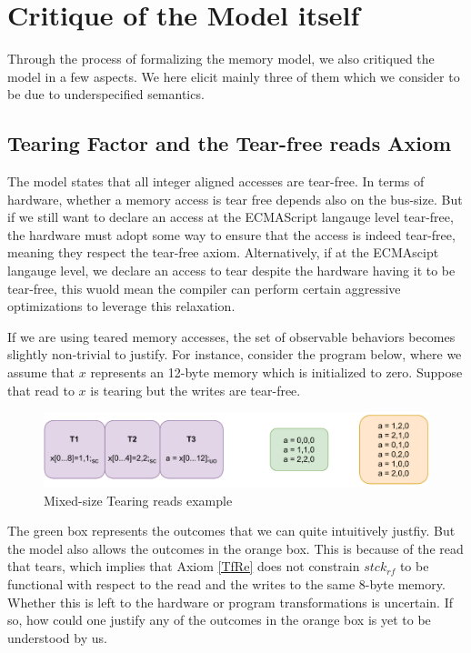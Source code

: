 \section{Critique of the Model itself}

    Through the process of formalizing the memory model, we also critiqued the model in a few aspects. 
    We here elicit mainly three of them which we consider to be due to underspecified semantics.

    \subsection{Tearing Factor and the Tear-free reads Axiom}

        The model states that all integer aligned accesses are tear-free.  
        In terms of hardware, whether a memory access is tear free depends also on the bus-size.
        But if we still want to declare an access at the ECMAScript langauge level tear-free, the hardware must adopt some way to ensure that the access is indeed tear-free, meaning they respect the tear-free axiom.
        Alternatively, if at the ECMAscipt langauge level, we declare an access to tear despite the hardware having it to be tear-free, this wuold mean the compiler can perform certain aggressive optimizations to leverage this relaxation. 

        If we are using teared memory accesses, the set of observable behaviors becomes slightly non-trivial to justify.
        For instance, consider the program below, where we assume that $x$ represents an 12-byte memory which is initialized to zero. 
        Suppose that read to $x$ is tearing but the writes are tear-free.
        
        \begin{figure}[H]
            \centering
            \includegraphics[scale=0.7]{7.ConclusionFutureWork/TearingExample.pdf}
            \caption{Mixed-size Tearing reads example}
        \end{figure}

        The green box represents the outcomes that we can quite intuitively justfiy.
        But the model also allows the outcomes in the orange box. 
        This is because of the read that tears, which implies that Axiom \ref{TfRe} does not constrain $stck{_{rf}}$ to be functional with respect to the read and the writes to the same 8-byte memory. 
        Whether this is left to the hardware or program transformations is uncertain.
        If so, how could one justify any of the outcomes in the orange box is yet to be understood by us. 


